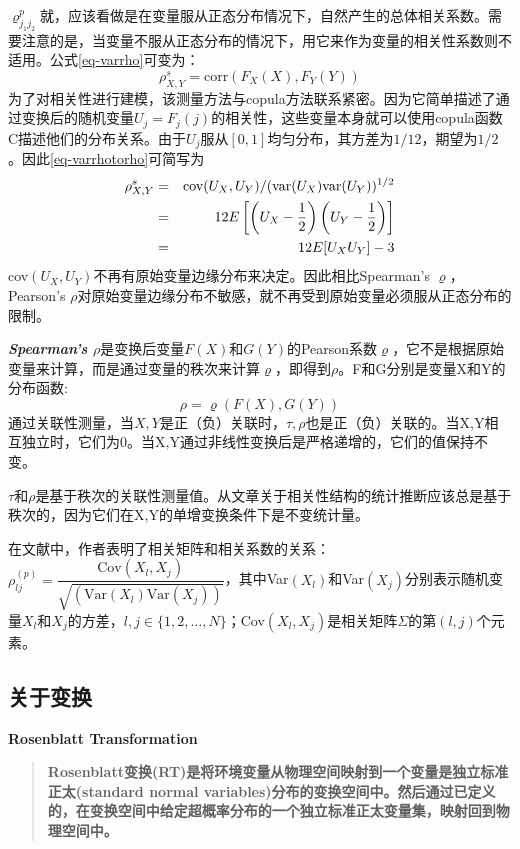 $\varrho_{j_1 j_2}^{p}$就，应该看做是在变量服从正态分布情况下，自然产生的总体相关系数。需要注意的是，当变量不服从正态分布的情况下，用它来作为变量的相关性系数则不适用\cite{Smith2009}。公式\ref{eq-varrho}可变为：
\begin{equation}
    \rho_{X,Y}^s = \text{corr}(F_{X}(X),F_{Y}(Y))
    \label{eq-varrhotorho}
\end{equation}
为了对相关性进行建模，该测量方法与copula方法联系紧密。因为它简单描述了通过变换后的随机变量$U_j = F_j(j)$的相关性，这些变量本身就可以使用copula函数C描述他们的分布关系。\textcolor[rgb]{1,0,0}{由于$U_j$服从$[0,1]$均匀分布}，其方差为$1/12$，期望为$1/2$。因此\cref{eq-varrhotorho}可简写为
\begin{eqnarray}
    \rho_{X,Y}^s &=& \text{cov}(U_{X},U_{Y})/(\text{var}(U_{X})\text{var}(U_{Y}))^{1/2} \notag \\
    &=& 12E \left[ \left(U_{X} - \dfrac{1}{2}\right)\left(U_{Y} - \dfrac{1}{2}\right) \right] \notag \\
    &=& 12E [U_{X}U_{Y}] -3
    \label{eq-rhoSimplified}
\end{eqnarray}
cov$(U_X,U_Y)$不再有原始变量边缘分布来决定。因此相比Spearman's $\varrho$，Pearson's $\rho$对原始变量边缘分布不敏感，就不再受到原始变量必须服从正态分布的限制。



\emph{\textbf{\textcolor[rgb]{1,0,0}{Spearman's $\rho$}}}是变换后变量$F(X)$和$G(Y)$的Pearson系数$\varrho$\cite{Montes2015}，它不是根据原始变量来计算，而是通过变量的秩次来计算$\varrho$，即得到$\rho$。F和G分别是变量X和Y的分布函数:
\begin{equation}
    \label{eq-rho}
    \rho = \varrho(F(X),G(Y))
\end{equation}
通过关联性测量，当$X,Y$是正（负）关联时，$\tau,\rho$也是正（负）关联的。当X,Y相互独立时，它们为0。当X,Y通过非线性变换后是严格递增的，它们的值保持不变。

\textcolor[rgb]{1,0,0}{$\tau$和$\rho$是基于秩次的关联性测量值。从文章\cite{Genest2007}关于相关性结构的统计推断应该总是基于秩次的，因为它们在X,Y的单增变换条件下是不变统计量。}


在文献\cite{Deligiannis2012}中，作者表明了相关矩阵和相关系数的关系：$\rho_{lj}^{(p)} = \dfrac{\text{Cov}(X_l,X_j)}{\sqrt{\left(\text{Var}(X_l)\text{Var}(X_j)\right)}}$，其中Var$(X_l)$和Var$(X_j)$分别表示随机变量$X_l$和$X_j$的方差，$l,j \in \{1,2,\dots,N\}$；Cov$(X_l,X_j)$是相关矩阵$\Sigma$的第$(l,j)$个元素。



\subsection{关于变换}
\textbf{\textcolor[rgb]{1,0,0}{Rosenblatt Transformation}}
\begin{quotation}
    \textbf{\textcolor[rgb]{1,0,0}{Rosenblatt变换(RT)是将环境变量从物理空间映射到一个变量是独立标准正太(standard normal variables)分布的变换空间中。然后通过已定义的，在变换空间中给定超概率分布的一个独立标准正太变量集，映射回到物理空间中。}}\cite{Montes2015}
\end{quotation}


